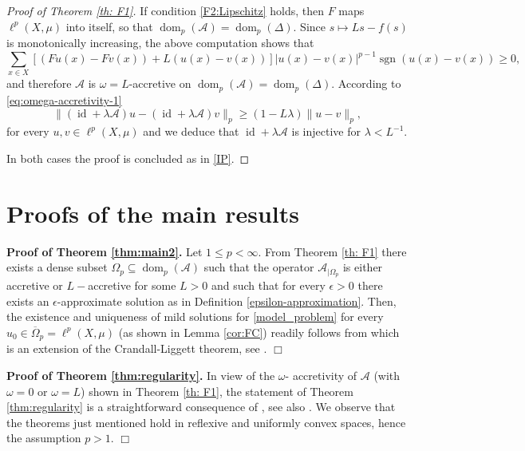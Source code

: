 \documentclass[journal]{article}
\theoremstyle{nonitalic}
\theoremstyle{nonitalic}
\theoremstyle{plain} %
\numberwithin{equation}{section}
\newcommand{\dom}{\operatorname{dom}}
\begin{document}
\begin{proof}[Proof of Theorem \ref{th: F1}]
If condition \textnormal{\ref{F2:Lipschitz}} holds, then $F$ maps $\ell^p(X,\mu)$ into itself, so that $\dom_p(\mathcal{A})=\dom_p(\Delta)$. Since $s\mapsto  Ls-f(s)$ is monotonically increasing, the above computation shows that 
\[
\sum_{x\in X} [(Fu(x)-Fv(x))+ L(u(x)-v(x) )]|u(x)-v(x)|^{p-1}\operatorname{sgn}(u(x)-v(x))\geq 0,
\]
and therefore $\mathcal{A}$ is $\omega=L$-accretive on $\dom_p(\mathcal{A})=\dom_p(\Delta)$.
According to \eqref{eq:omega-accretivity-1}
\[
\|(\operatorname{id}+\lambda\mathcal{A})u-(\operatorname{id}+\lambda\mathcal{A})v
\|_p\geq (1-L\lambda)\|u-v\|_p,
\]
for every $u,v\in\ell^p(X,\mu)$
and we deduce that $\operatorname{id}+\lambda \mathcal{A}$
is injective for $\lambda<L^{-1}$.

In both cases the proof is concluded as in  \textnormal{\ref{IP}}.
\end{proof}





\section{Proofs of the main results}\label{s:proofs}


 \textbf{Proof of Theorem \ref{thm:main2}.} Let $1\leq p<\infty$. From Theorem \ref{th: F1} there exists a dense subset $\Omega_p \subseteq \dom_p(\mathcal{A})$ such that the operator $\mathcal{\mathcal A}_{|\Omega_p}$ is either accretive or $L-$accretive for some $L>0$ and such that for every $\epsilon>0$ there exists an $\epsilon$-approximate solution as in Definition \ref{epsilon-approximation}. Then, the existence and uniqueness of mild solutions for \ref{model_problem} for every $u_0\in \overline{\Omega}_p=\ell^p(X,\mu)$ (as shown in Lemma \ref{cor:FC}) readily follows from \cite[Theorem 4.1]{barbu2010nonlinear} which is an extension of the Crandall-Liggett theorem, see \cite{crandall1971generation}.  $\Box$

 
 
 \textbf{Proof of Theorem \ref{thm:regularity}.}
In view of the $\omega$- accretivity of $\mathcal A$ (with $\omega=0$ or $\omega=L$) shown in Theorem \ref{th: F1}, the statement of Theorem \ref{thm:regularity} is a straightforward consequence of \cite[Theorems 4.5 and 4.6]{barbu2010nonlinear}, see also \cite[Remark 4.1]{barbu2010nonlinear}. We observe that the theorems just mentioned hold in reflexive and uniformly convex spaces, hence the assumption $p>1$.
$\Box$
\end{document}

